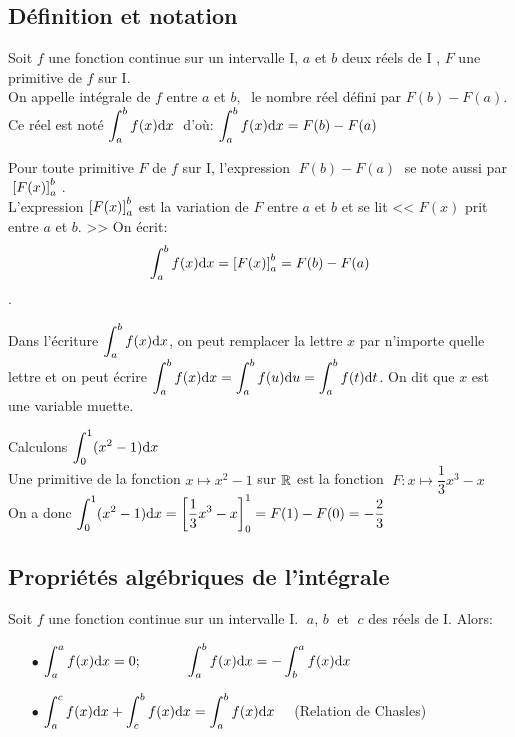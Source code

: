 \subsection{Définition et notation}
\begin{definition}
Soit $f$ une fonction continue sur un intervalle I, $ a $  et $ b $  deux réels de I , $F$ une primitive de $f$ sur I.\\
 On appelle intégrale de $f$ entre $ a $  et $ b,\; $  le nombre  réel défini par $F(b)-F(a) $.\\
 
Ce réel est noté $ \displaystyle\int_{a}^{b}f(x){\rm d}x \;$  d'où:
$ \displaystyle\int_{a}^{b}f(x){\rm d}x=F(b)-F(a) $

\end{definition}
\begin{notation}
 Pour toute primitive $F$  de $f$ sur I, l'expression $\; F(b)-F(a)\; $  se note aussi par  $\;\left[ F(x) \right]^{b}_{a} \; $.\\
  L'expression $\left[ F(x) \right]^{b}_{a} $   est la variation de $F$ entre  $ a $  et $ b $ et se lit << $ F(x) $   prit entre  $ a $  et $ b $. >> On écrit:
    $$  \displaystyle\int_{a}^{b}f(x){\rm d}x= \left[ F(x) \right]^{b}_{a}=F(b)-F(a) $$.
\end{notation}
 \begin{remark}
  Dans l'écriture  $ \displaystyle\int_{a}^{b}f(x){\rm d}x $, on peut remplacer la lettre $ x $ par n'importe quelle    lettre  et on peut écrire   $ \displaystyle\int_{a}^{b}f(x){\rm d}x  =  \displaystyle\int_{a}^{b}f(u){\rm d}u =  \displaystyle\int_{a}^{b}f(t){\rm d}t $. On dit que $ x $ est une variable muette.
 
  \end{remark}
 \begin{example}
Calculons $ \displaystyle\int_{0}^{1}(x^{2}-1){\rm d}x $\\
 Une primitive de la fonction  $ x\longmapsto x^{2}-1 $  sur $ \mathbb{R} $ est la fonction  $\; F:  x\longmapsto \dfrac{1}{3}x^{3}-x $\\ On a donc  $ \displaystyle\int_{0}^{1}(x^{2}-1){\rm d}x= \left[ \frac{1}{3}x^{3}- x \right]^{1}_{0}=F(1)-F(0) =-\frac{2}{3}$
 \end{example}
 
 \subsection{Propriétés algébriques de l'intégrale}
 \begin{property}
 Soit $f$ une fonction continue sur un intervalle I. $\; a $, $b \; $  et $ \; c $ des  réels de I. Alors:     \\
 \begin{itemize}
\item[$  \bullet$]  $ \displaystyle\int_{a}^{a}f(x){\rm d}x =0;\qquad \quad \; \displaystyle\int_{a}^{b}f(x){\rm d}x = -\displaystyle\int_{b}^{a}f(x){\rm d}x$
 \item[$  \bullet$] $ \displaystyle\int_{a}^{c}f(x){\rm d}x +\displaystyle\int_{c}^{b}f(x){\rm d}x=\displaystyle\int_{a}^{b}f(x){\rm d}x\quad $ (Relation de Chasles)
  \end{itemize}
  \end{property}
 
